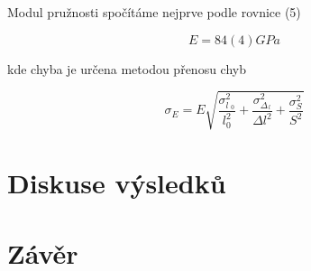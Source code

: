 Modul pružnosti spočítáme nejprve podle rovnice (5)

\begin{equation}
    \nonumber
    E = 84(4) GPa
\end{equation}

kde chyba je určena metodou přenosu chyb

\begin{equation}
    \sigma_E = E \sqrt{\frac{\sigma^2_l__0}{l^2_0}+\frac{\sigma^2_\Delta__l}{\Delta l^2}+\frac{\sigma^2_S}{S^2}}
\end{equation}

\section{Diskuse výsledků}

\section{Závěr}
